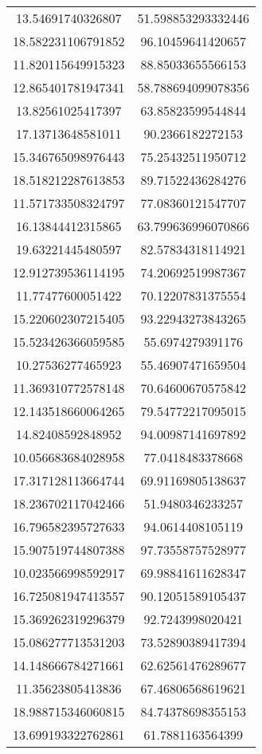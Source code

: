 \begin{table}
\begin{tabular}{cc}
13.54691740326807 & 51.598853293332446 \\
18.582231106791852 & 96.10459641420657 \\
11.820115649915323 & 88.85033655566153 \\
12.865401781947341 & 58.788694099078356 \\
13.82561025417397 & 63.85823599544844 \\
17.13713648581011 & 90.2366182272153 \\
15.346765098976443 & 75.25432511950712 \\
18.518212287613853 & 89.71522436284276 \\
11.571733508324797 & 77.08360121547707 \\
16.13844412315865 & 63.799636996070866 \\
19.63221445480597 & 82.57834318114921 \\
12.912739536114195 & 74.20692519987367 \\
11.77477600051422 & 70.12207831375554 \\
15.220602307215405 & 93.22943273843265 \\
15.523426366059585 & 55.6974279391176 \\
10.27536277465923 & 55.46907471659504 \\
11.369310772578148 & 70.64600670575842 \\
12.143518660064265 & 79.54772217095015 \\
14.82408592848952 & 94.00987141697892 \\
10.056683684028958 & 77.0418483378668 \\
17.317128113664744 & 69.91169805138637 \\
18.236702117042466 & 51.9480346233257 \\
16.796582395727633 & 94.0614408105119 \\
15.907519744807388 & 97.73558757528977 \\
10.023566998592917 & 69.98841611628347 \\
16.725081947413557 & 90.12051589105437 \\
15.369262319296379 & 92.7243998020421 \\
15.086277713531203 & 73.52890389417394 \\
14.148666784271661 & 62.62561476289677 \\
11.35623805413836 & 67.46806568619621 \\
18.988715346060815 & 84.74378698355153 \\
13.699193322762861 & 61.7881163564399 \\

\end{tabular}
\end{table}
